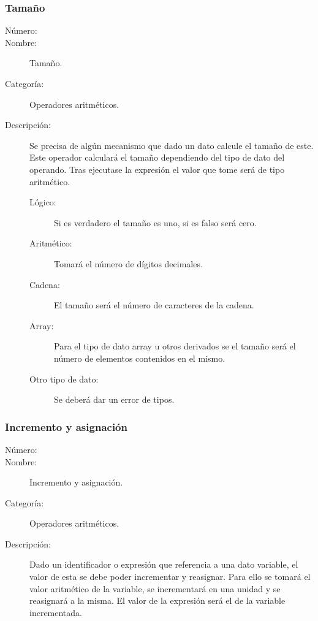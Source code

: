 \subsubsection{Tamaño}
	\begin{description}
		\item [Número:] \cn
		\item [Nombre:] Tamaño.
		\item [Categoría:] Operadores aritméticos.
		\item [Descripción:] Se precisa de algún mecanismo que dado un dato calcule el tamaño de este. Este operador calculará el
		tamaño dependiendo del tipo de dato del operando. Tras ejecutase la expresión el valor que tome será de tipo aritmético.
		\begin{description}
			\item[Lógico:] Si es verdadero el tamaño es uno, si es falso será cero.
			\item[Aritmético:] Tomará el número de dígitos decimales.
			\item[Cadena:] El tamaño será el número de caracteres de la cadena.
			\item[Array:] Para el tipo de dato array u otros derivados se el tamaño será el número de elementos contenidos en el mismo.
			\item[Otro tipo de dato:] Se deberá dar un error de tipos.
		\end{description}
	\end {description}

\subsubsection{Incremento y asignación}
	\begin{description}
		\item [Número:] \cn
		\item [Nombre:] Incremento y asignación.
		\item [Categoría:] Operadores aritméticos.
		\item [Descripción:] Dado un identificador o expresión que referencia a una dato variable, el valor de esta se debe poder incrementar y
		reasignar. Para ello se tomará el valor aritmético de la variable, se incrementará en una unidad y se reasignará a la misma.
		El valor de la expresión será el de la variable incrementada.
	\end {description}

